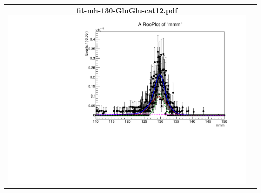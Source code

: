 \begin{longtable}{|c|c|}
{}
 \\
\hline
\parbox{0.49\textwidth}{
\centering
{\bfseries fit-mh-130-GluGlu-cat12.pdf}
\includegraphics[width=.49\textwidth]{figures/signal_model/AppendixBdt/GluGlu/130/fit_mh_130_GluGlu_cat12.pdf}
}
 & \\ \hline
\end{longtable}
